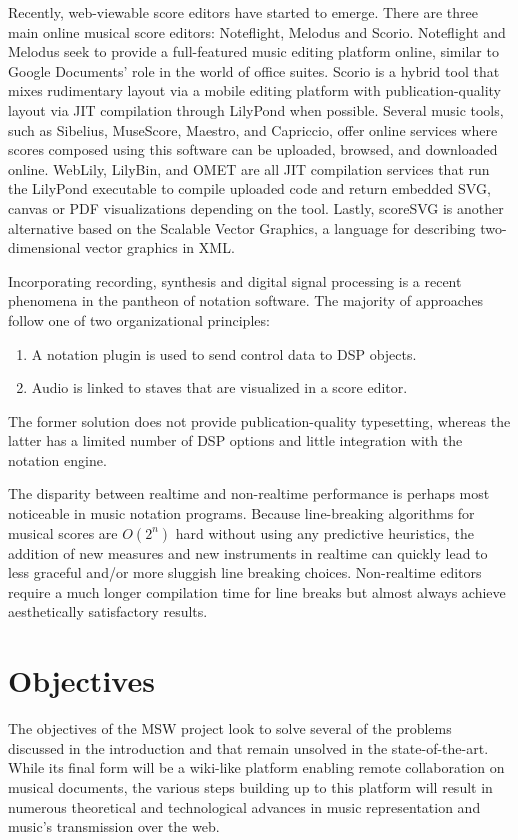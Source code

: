 \documentclass{article}
\begin{document}
Recently, web-viewable score editors have started to emerge. There are three
main online musical score editors: Noteflight, Melodus and Scorio.
Noteflight and Melodus seek to provide a full-featured music editing
platform online, similar to Google Documents’ role in the world of office
suites. Scorio is a hybrid tool that mixes rudimentary layout via a mobile
editing platform with publication-quality layout via JIT compilation through
LilyPond when possible. Several music tools, such as Sibelius, MuseScore,
Maestro, and Capriccio, offer online services where scores composed using
this software can be uploaded, browsed, and downloaded online. WebLily,
LilyBin, and OMET are all JIT compilation services that run the LilyPond
executable to compile uploaded code and return embedded SVG, canvas or PDF
visualizations depending on the tool. Lastly, scoreSVG is another
alternative based on the Scalable Vector Graphics, a language for describing
two-\-di\-men\-sion\-al vector graphics in XML.

Incorporating recording, synthesis and digital signal processing is a recent
phenomena in the pantheon of notation software.  The majority of approaches
follow one of two organizational principles:
\begin{enumerate}
\item A notation plugin is used to send control data to DSP objects.
\item Audio is linked to staves that are visualized in a score editor.
\end{enumerate}
The former solution does not provide publication-quality typesetting,
whereas the latter has a limited number of DSP options and little
integration with the notation engine.

The disparity between realtime and non-realtime performance is perhaps most
noticeable in music notation programs. Because line-breaking algorithms for
musical scores are $O(2^n)$ hard without using any predictive heuristics, the
addition of new measures and new instruments in realtime can quickly lead to
less graceful and/or more sluggish line breaking choices. Non-realtime
editors require a much longer compilation time for line breaks but almost
always achieve aesthetically satisfactory results.



\section{Objectives}\label{sec:objectives}
The objectives of the MSW project look to solve several of the problems
discussed in the introduction and that remain unsolved in the
state-of-the-art. While its final form will be a wiki-like platform enabling
remote collaboration on musical documents, the various steps building up to
this platform will result in numerous theoretical and technological advances
in music representation and music's transmission over the web.
\end{document}
